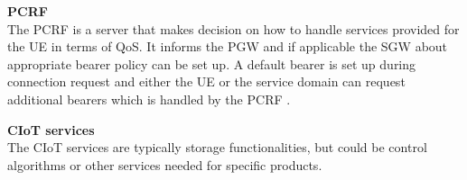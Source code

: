\textbf{\gls{PCRF}}\\
The \gls{PCRF} is a server that makes decision on how to handle services provided for the \gls{UE} in terms of \gls{QoS}. It informs the \gls{PGW} and if applicable the \gls{SGW} about appropriate bearer policy can be set up. A default bearer is set up during connection request and either the \gls{UE} or the service domain can request additional bearers which is handled by the \gls{PCRF} \citep[ch. 3]{book_LTE_for_UMTS}.

\textbf{\gls{CIoT} services}\\
The \gls{CIoT} services are typically storage functionalities, but could be control algorithms or other services needed for specific products. 


